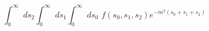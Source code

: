 \begin{equation}
  \int^\infty_0\,\,ds_2
  \int^\infty_0\,\,ds_1
    \int^\infty_0\,\,ds_0\,\,
    f(s_0,s_1,s_2)e^{-m^2(s_0+s_1+s_2)}
\end{equation}

